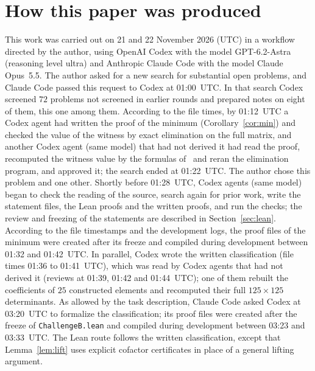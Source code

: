 \documentclass[11pt]{article}
\theoremstyle{definition}
\theoremstyle{remark}
\begin{document}
\section*{How this paper was produced}
This work was carried out on 21 and 22 November 2026 (UTC) in a workflow directed by
the author, using OpenAI Codex with the model GPT-6.2-Astra (reasoning level
ultra) and Anthropic Claude Code with the model Claude Opus~5.5. The author
asked for a new search for substantial open problems, and Claude Code passed
this request to Codex at 01:00~UTC. In that search Codex screened $72$
problems not screened in earlier rounds and prepared notes on eight of them,
this one among them. According to the file times, by 01:12~UTC a Codex agent
had written the proof of the minimum (Corollary~\ref{cor:min}) and checked the
value of the witness by exact elimination on the full matrix, and another
Codex agent (same model) that had not derived it had read the proof,
recomputed the witness value by the formulas of~\cite{mp} and reran the
elimination program,
and approved it; the search ended at 01:22~UTC. The author chose this problem
and one other. Shortly before 01:28~UTC, Codex agents (same model) began to
check the reading of the source, search again for prior work, write the
statement files, the Lean proofs and the written proofs, and run the checks;
the review and freezing of the statements are described in
Section~\ref{sec:lean}. According to the file timestamps and the development
logs, the proof files of the minimum were created after its freeze and
compiled during development between 01:32 and 01:42~UTC. In parallel, Codex
wrote the written classification (file times 01:36 to 01:41~UTC), which was
read by Codex agents that had not derived it (reviews at 01:39, 01:42 and
01:44~UTC); one of them rebuilt the coefficients of $25$ constructed elements and recomputed
their full $125\times125$ determinants. As allowed by the task description,
Claude Code asked Codex at 03:20~UTC to formalize the classification; its proof
files were created after the freeze of \texttt{ChallengeB.lean} and compiled
during development between 03:23 and 03:33~UTC. The Lean route follows the
written classification, except that Lemma~\ref{lem:lift} uses explicit
cofactor certificates in place of a general lifting argument.
\end{document}
